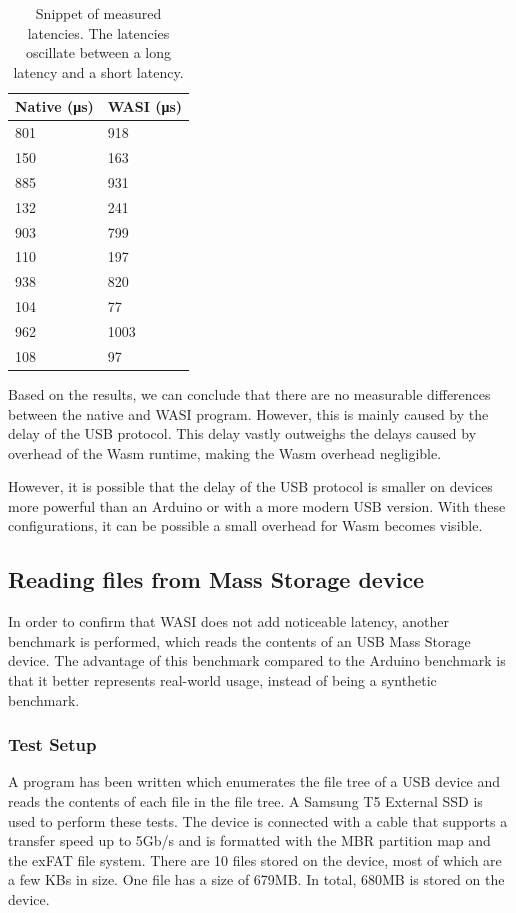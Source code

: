 \begin{table}[h!]
\centering
\begin{tabular}{|l|l|}
\hline
\textbf{Native (μs)} & \textbf{WASI (μs)} \\
\hline
801 & 918 \\
\hline
150 & 163 \\
\hline
885 & 931 \\
\hline
132 & 241 \\
\hline
903 & 799 \\
\hline
110 & 197 \\
\hline
938 & 820 \\
\hline
104 & 77 \\
\hline
962 & 1003 \\
\hline
108 & 97 \\
\hline
\end{tabular}
\caption{Snippet of measured latencies. The latencies oscillate between a long latency and a short latency.}
\label{table:arduino_output}
\end{table}

Based on the results, we can conclude that there are no measurable differences between the native and \acrshort{WASI} program. However, this is mainly caused by the delay of the USB protocol. This delay vastly outweighs the delays caused by overhead of the Wasm runtime, making the Wasm overhead negligible.

However, it is possible that the delay of the USB protocol is smaller on devices more powerful than an Arduino or with a more modern USB version. With these configurations, it can be possible a small overhead for Wasm becomes visible.

\subsection{Reading files from Mass Storage device}
\label{section:mass_storage_latency}

In order to confirm that WASI does not add noticeable latency, another benchmark is performed, which reads the contents of an USB Mass Storage device. The advantage of this benchmark compared to the Arduino benchmark is that it better represents real-world usage, instead of being a synthetic benchmark.

\subsubsection{Test Setup}
A program has been written which enumerates the file tree of a USB device and reads the contents of each file in the file tree. A Samsung T5 External SSD is used to perform these tests. The device is connected with a cable that supports a transfer speed up to 5Gb/s and is formatted with the \acrshort{MBR} partition map and the \acrshort{exFAT} file system. There are 10 files stored on the device, most of which are a few KBs in size. One file has a size of 679MB. In total, 680MB is stored on the device.

